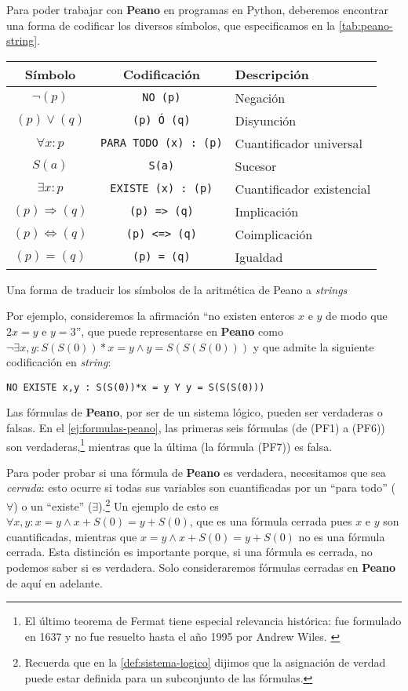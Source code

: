 Para poder trabajar con \textbf{Peano} en programas en Python, deberemos encontrar una forma de codificar los diversos símbolos, que especificamos en la \cref{tab:peano-string}.
\begin{tabla}
\begin{table}[H]
\centering
\begin{tabular}{@{}ccl@{}}
\toprule
Símbolo & Codificación & Descripción \\ \midrule
$\neg(p)$ & \texttt{NO (p)} & Negación \\
$(p) \vee (q)$ & \texttt{(p) Ó (q)} & Disyunción \\
$\forall x : p$ & \texttt{PARA TODO (x) : (p)} & Cuantificador universal \\
$S(a)$ & \texttt{S(a)} & Sucesor \\
$\exists x : p$ & \texttt{EXISTE (x) : (p)} & Cuantificador existencial \\
$(p) \Rightarrow (q)$ & \texttt{(p)}\texttt{ }\texttt{=>}\texttt{ }\texttt{(q)} & Implicación \\
$(p) \iff (q)$ & \texttt{(p)}\texttt{ }\texttt{<=>}\texttt{ }\texttt{(q)} & Coimplicación \\
$(p)=(q)$ & \texttt{(p) = (q)} & Igualdad \\\bottomrule
\end{tabular}
\end{table}
\vspace{-8pt}
\caption{Una forma de traducir los símbolos de la aritmética de Peano a \emph{strings}}
\label{tab:peano-string}
\end{tabla}
Por ejemplo, consideremos la afirmación ``no existen enteros $x$ e $y$ de modo que $2x=y$ e $y=3$'', que puede representarse en \textbf{Peano} como $\neg\exists x, y : S(S(0))*x = y \wedge y = S(S(S(0)))$ y que admite la siguiente codificación en \emph{string}:
\begin{lstlisting}[numbers=none,frame=none]
NO EXISTE x,y : S(S(0))*x = y Y y = S(S(S(0)))
\end{lstlisting}
Las fórmulas de \textbf{Peano}, por ser de un sistema lógico, pueden ser verdaderas o falsas. En el \cref{ej:formulas-peano}, las primeras seis fórmulas (de (PF1) a (PF6)) son verdaderas,\footnote{El último teorema de Fermat tiene especial relevancia histórica: fue formulado en 1637 y no fue resuelto hasta el año 1995 por Andrew Wiles. \cite{Wiles1995}} mientras que la última (la fórmula (PF7)) es falsa.

Para poder probar si una fórmula de \textbf{Peano} es verdadera, necesitamos que sea \emph{cerrada}: esto ocurre si todas sus variables son cuantificadas por un ``para todo'' ($\forall$) o un ``existe'' ($\exists$).\footnote{Recuerda que en la \cref{def:sistema-logico} dijimos que la asignación de verdad puede estar definida para un subconjunto de las fórmulas.} Un ejemplo de esto es $\forall x,y : x=y \wedge x+S(0)=y+S(0)$, que es una fórmula cerrada pues $x$ e $y$ son cuantificadas, mientras que $x=y \wedge x+S(0)=y+S(0)$ no es una fórmula cerrada. Esta distinción es importante porque, si una fórmula es cerrada, no podemos saber si es verdadera. Solo consideraremos fórmulas cerradas en \textbf{Peano} de aquí en adelante.

